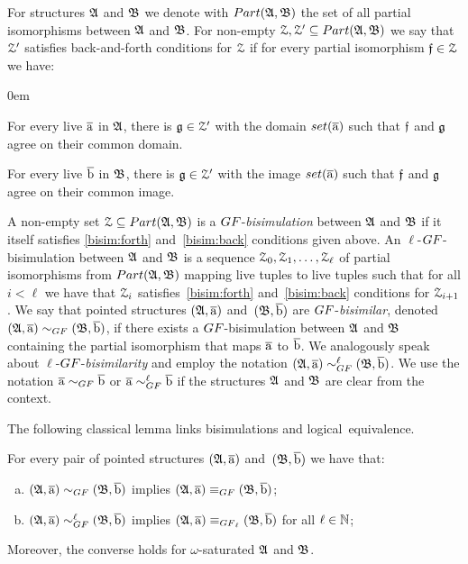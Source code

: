 For structures ${\mathfrak{A}}$ and ${\mathfrak{B}}$ we denote with $\PartIso{\str{A}}{\str{B}}$ the set of all partial isomorphisms between ${\mathfrak{A}}$ and ${\mathfrak{B}}$.
For non-empty $\bisimZ, \bisimZ' \subseteq \PartIso{\str{A}}{\str{B}}$ we say that $\mathcal{Z}'$ satisfies back-and-forth conditions for $\mathcal{Z}$ if for every partial isomorphism $\mathfrak{f} \in \mathcal{Z}$ we have:
%
\begin{description}\itemsep0em
  \item[\desclabel{(Forth)}{bisim:forth}] For every live $\overline{\mathrm{a}}$ in ${\mathfrak{A}}$, there is $\mathfrak{g} \in \mathcal{Z}'$ with the domain $\set(\elemtuplea)$ such that $\mathfrak{f}$ and $\mathfrak{g}$ agree on their common domain.
  \item[\desclabel{(Back)}{bisim:back}] For every live $\overline{\mathrm{b}}$ in ${\mathfrak{B}}$, there is $\mathfrak{g} \in \mathcal{Z}'$ with the image $\set(\elemtuplea)$ such that $\mathfrak{f}$ and $\mathfrak{g}$ agree on their common image.
\end{description}
A non-empty set $\bisimZ \subseteq \PartIso{\str{A}}{\str{B}}$ is a $\GF$-\emph{bisimulation} between ${\mathfrak{A}}$ and ${\mathfrak{B}}$ if it itself satisfies \ref{bisim:forth} and~\ref{bisim:back} conditions given above.
An $\ell$-$\GF$-bisimulation between ${\mathfrak{A}}$ and ${\mathfrak{B}}$ is a sequence $\mathcal{Z}_0, \mathcal{Z}_1, \ldots, \mathcal{Z}_\ell$ of partial isomorphisms from $\PartIso{\str{A}}{\str{B}}$ mapping live tuples to live tuples such that for all $i < \ell$ we have that $\mathcal{Z}_i$ satisfies~\ref{bisim:forth} and~\ref{bisim:back} conditions for $\mathcal{Z}_{i{+}1}$.
We say that pointed structures $({\mathfrak{A}}, \overline{\mathrm{a}})$ and~$({\mathfrak{B}}, \overline{\mathrm{b}})$ are $\GF$-\emph{bisimilar}, denoted $(\str{A}, \elemtuplea) \bisimto_{\GF} (\str{B}, \elemtupleb)$, if there exists a $\GF$-bisimulation between ${\mathfrak{A}}$ and ${\mathfrak{B}}$ containing the partial isomorphism that maps $\overline{\mathrm{a}}$ to $\overline{\mathrm{b}}$.
We analogously speak about $\ell$-$\GF$-\emph{bisimilarity} and employ the notation $(\str{A}, \elemtuplea) \bisimto_{\GF}^{\ell} (\str{B}, \elemtupleb)$.
We use the notation $\elemtuplea \bisimto_{\GF} \elemtupleb$ or $\elemtuplea \bisimto_{\GF}^{\ell} \elemtupleb$ if the structures ${\mathfrak{A}}$ and ${\mathfrak{B}}$ are clear from the context.

The following classical lemma links bisimulations and logical~equivalence.
\begin{lemma}\label{lemma:GF-bisimulations-work-well}
For every pair of pointed structures $({\mathfrak{A}}, \overline{\mathrm{a}})$ and~$({\mathfrak{B}}, \overline{\mathrm{b}})$ we have that:
\begin{enumerate}[(a)]
\item $(\str{A}, \elemtuplea) \bisimto_{\GF} (\str{B}, \elemtupleb)$ implies $(\str{A}, \elemtuplea) \equiv_{\GF} (\str{B}, \elemtupleb)$;
\item $(\str{A}, \elemtuplea) \bisimto_{\GF}^{\ell} (\str{B}, \elemtupleb)$ implies $(\str{A}, \elemtuplea) \equiv_{\GF_\ell} (\str{B}, \elemtupleb)$ for all $\ell \in {\mathbb{N}}$;
\end{enumerate}
Moreover, the converse holds for $\omega$-saturated ${\mathfrak{A}}$ and ${\mathfrak{B}}$.
\end{lemma}

